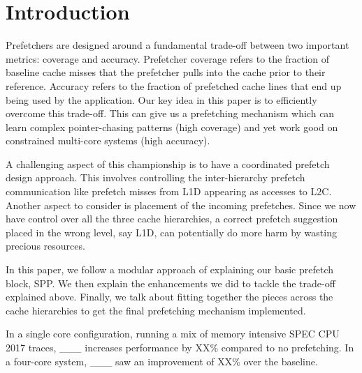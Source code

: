 \section{Introduction}
\label{Introduction}

Prefetchers are designed around a fundamental trade-off between
two important metrics: coverage and accuracy. Prefetcher coverage
refers to the fraction of baseline cache misses that the prefetcher
pulls into the cache prior to their reference. Accuracy refers to 
the fraction of prefetched cache lines that end up
being used by the application. Our key idea in this paper is to 
efficiently overcome this trade-off. This can give us a prefetching 
mechanism which can learn complex pointer-chasing patterns (high coverage)
and yet work good on constrained multi-core systems (high accuracy).

A challenging aspect of this championship is to have a coordinated 
prefetch design approach. This involves controlling the inter-hierarchy 
prefetch communication like prefetch misses from L1D appearing as accesses 
to L2C. Another aspect to consider is placement of the incoming prefetches.
Since we now have control over all the three cache hierarchies, a correct 
prefetch suggestion placed in the wrong level, say L1D, can potentially 
do more harm by wasting precious resources.

In this paper, we follow a modular approach of explaining our basic prefetch
block, SPP. We then explain the enhancements we did to tackle the 
trade-off explained above. Finally, we talk about fitting together the 
pieces across the cache hierarchies to get the final prefetching mechanism 
implemented.

In a single core configuration, running a mix of memory intensive SPEC CPU 
2017 traces, \_\_\_ increases performance by XX\% compared to no prefetching. 
In a four-core system, \_\_\_ saw an improvement of XX\% over the baseline.
